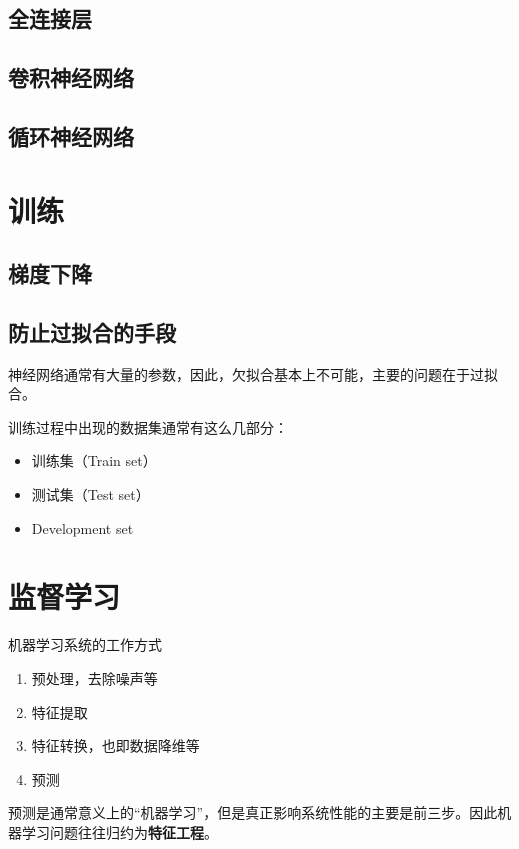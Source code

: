\documentclass[UTF8, a4paper]{ctexart}
\begin{document}
\subsection{全连接层}

\subsection{卷积神经网络}

\subsection{循环神经网络}

\section{训练}

\subsection{梯度下降}

\subsection{防止过拟合的手段}
神经网络通常有大量的参数，因此，欠拟合基本上不可能，主要的问题在于过拟合。

训练过程中出现的数据集通常有这么几部分：
\begin{itemize}
    \item 训练集（Train set）
    \item 测试集（Test set）
    \item Development set
\end{itemize}

\section{监督学习}

机器学习系统的工作方式
\begin{enumerate}
    \item 预处理，去除噪声等 
    \item 特征提取
    \item 特征转换，也即数据降维等
    \item 预测
\end{enumerate}
预测是通常意义上的“机器学习”，但是真正影响系统性能的主要是前三步。因此机器学习问题往往归约为\textbf{特征工程}。
\end{document}
